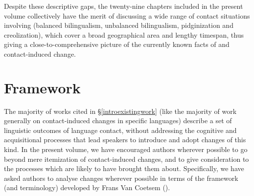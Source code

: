 \documentclass[output=paper]{langsci/langscibook}
\begin{document}
Despite these descriptive gaps, the twenty-nine chapters included in the present volume collectively have the merit of discussing a wide range of contact situations involving  (balanced {bilingualism}, unbalanced {bilingualism}, pidginization and creolization), which cover a broad geographical area and lengthy timespan, thus giving a close-to-comprehensive picture of the currently known facts of  and contact-induced change.

\section{Framework}\label{introvc}
The majority of works cited in §\ref{introexistingwork} (like the majority of work generally on contact-induced changes in specific languages) describe a set of linguistic outcomes of language contact, without addressing the cognitive and acquisitional processes that lead speakers to introduce and adopt changes of this kind. In the present volume, we have encouraged authors wherever possible to go beyond mere itemization of contact-induced changes, and to give consideration to the processes which are likely to have brought them about. Specifically, we have asked authors to analyse changes wherever possible in terms of the framework (and terminology) developed by Frans Van Coetsem (\citeyear{VanCoetsem1988,VanCoetsem2000}).
\end{document}
